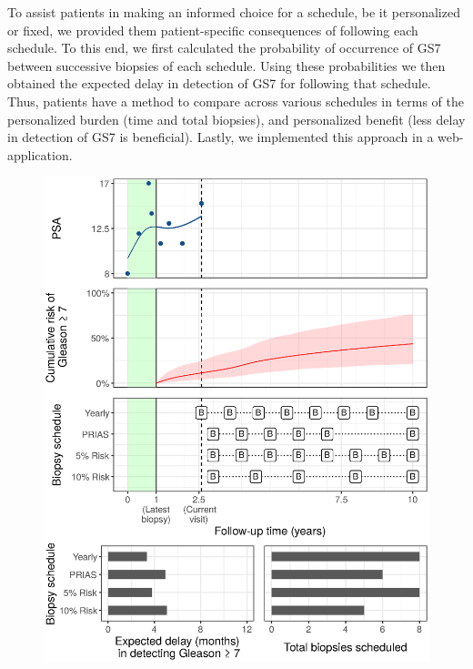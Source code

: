To assist patients in making an informed choice for a schedule, be it personalized or fixed, we provided them patient-specific consequences of following each schedule. To this end, we first calculated the probability of occurrence of GS7 between successive biopsies of each schedule. Using these probabilities we then obtained the expected delay in detection of GS7 for following that schedule. Thus, patients have a method to compare across various schedules in terms of the personalized burden (time and total biopsies), and personalized benefit (less delay in detection of GS7 is beneficial). Lastly, we implemented this approach in a web-application.

\begin{figure}[!htb]
\centerline{\includegraphics[width=\columnwidth]{images/demo_pat1.eps}}
\caption{}
\label{fig:demo_pat1}
\end{figure}
